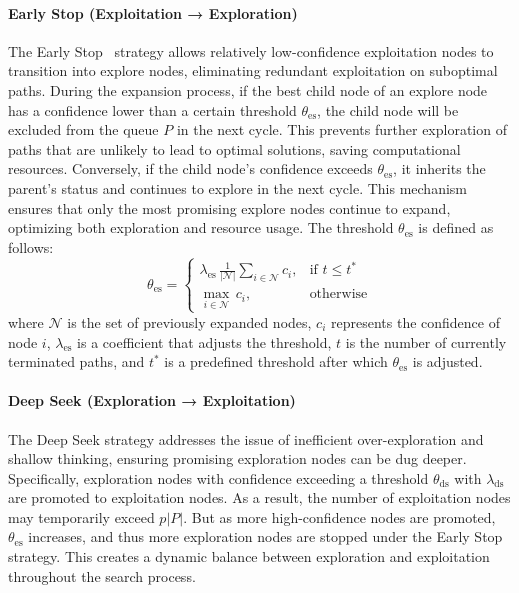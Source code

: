 \paragraph{Early Stop (Exploitation → Exploration)} 
The Early Stop~\cite{yao2007early} strategy allows relatively low-confidence exploitation nodes to transition into explore nodes, eliminating redundant exploitation on suboptimal paths. 
During the expansion process, if the best child node of an explore node has a confidence lower than a certain threshold \( \theta_{\mathrm{es}} \), the child node will be excluded from the queue \( P \) in the next cycle. This prevents further exploration of paths that are unlikely to lead to optimal solutions, saving computational resources. Conversely, if the child node’s confidence exceeds \( \theta_{\mathrm{es}} \), it inherits the parent’s status and continues to explore in the next cycle. This mechanism ensures that only the most promising explore nodes continue to expand, optimizing both exploration and resource usage.
The threshold \( \theta_{\mathrm{es}} \) is defined as follows:
\begin{equation}
\label{eq:theta}
\mathsf{\theta}_{\mathrm{es}} = \begin{cases}
\lambda_\mathrm{es} \, \frac{1}{|\mathcal{N}|} \sum\limits_{i \in \mathcal{N}} c_i, & \text{if } t \leq t^* \\
\underset{i \in \mathcal{N}}{\max} \, c_i, & \text{otherwise}
\end{cases}
\end{equation}
where \( \mathcal{N} \) is the set of previously expanded nodes, \( c_i \) represents the confidence of node \( i \), \( \lambda_\mathrm{es} \) is a coefficient that adjusts the threshold, \( t \) is the number of currently terminated paths, and \( t^* \) is a predefined threshold after which \( \theta_{\mathrm{es}} \) is adjusted.


\paragraph{Deep Seek (Exploration → Exploitation)} 
The Deep Seek strategy addresses the issue of inefficient over-exploration and shallow thinking, ensuring promising exploration nodes can be dug deeper. Specifically, exploration nodes with confidence exceeding a threshold \( \theta_{\mathrm{ds}} \) with $\lambda_\mathrm{ds}$ are promoted to exploitation nodes. 
As a result, the number of exploitation nodes may temporarily exceed \( p|P| \). But as more high-confidence nodes are promoted, \( \theta_{\mathrm{es}} \) increases, and thus more exploration nodes are stopped under the Early Stop strategy. This creates a dynamic balance between exploration and exploitation throughout the search process. 

